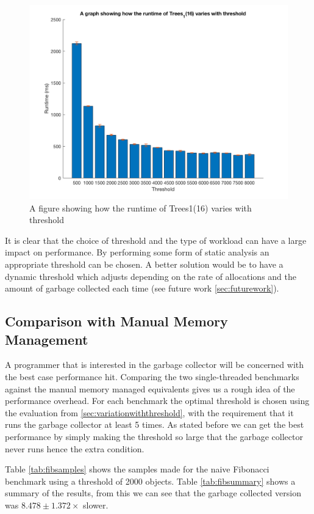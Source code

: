 \documentclass[../diss.tex]{subfiles}
\begin{document}
\begin{figure}
    \centering
    \includegraphics[max width=\linewidth]{figs/threes_thresh.png}
    \caption{A figure showing how the runtime of Trees1(16) varies with threshold}
    \label{fig:trees_thresh}
\end{figure}

It is clear that the choice of threshold and the type of workload can have a large impact on performance. By performing some form of static analysis an appropriate threshold can be chosen. A better solution would be to have a dynamic threshold which adjusts depending on the rate of allocations and the amount of garbage collected each time (see future work \cref{sec:futurework}).

\subsection{Comparison with Manual Memory Management}

A programmer that is interested in the garbage collector will be concerned with the best case performance hit. Comparing the two single-threaded benchmarks against the manual memory managed equivalents gives us a rough idea of the performance overhead. For each benchmark the optimal threshold is chosen using the evaluation from \cref{sec:variationwiththreshold}, with the requirement that it runs the garbage collector at least 5 times. As stated before we can get the best performance by simply making the threshold so large that the garbage collector never runs hence the extra condition.

Table \ref{tab:fibsamples} shows the samples made for the naive Fibonacci benchmark using a threshold of 2000 objects. Table \ref{tab:fibsummary} shows a summary of the results, from this we can see that the garbage collected version was $8.478 \pm 1.372\times$ slower.
\end{document}
